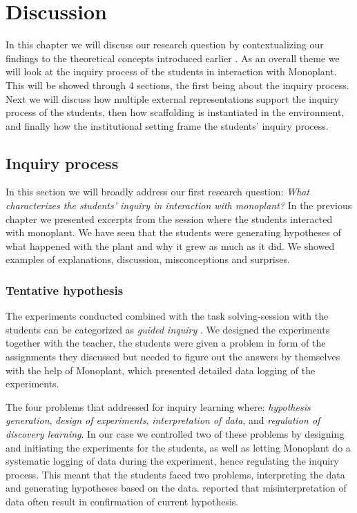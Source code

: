 \chapter{Discussion}
In this chapter we will discuss our research question by contextualizing our findings to the theoretical concepts introduced earlier . As an overall theme we will look at the inquiry process of the students in interaction with Monoplant. This will be showed through 4 sections, the first being about the inquiry process. Next we will discuss how multiple external representations support the inquiry process of the students, then how scaffolding is instantiated in the environment, and finally how the institutional setting frame the students' inquiry process.


\section{Inquiry process}
In this section we will broadly address our first research question: \emph{What characterizes the students’ inquiry in interaction with monoplant?}
In the previous chapter we presented excerpts from the session where the students interacted with monoplant. We have seen that the students were generating hypotheses of what happened with the plant and why it grew as much as it did. We showed examples of explanations, discussion, misconceptions and surprises.

\subsection{Tentative hypothesis}
The experiments conducted combined with the task solving-session with the students can be categorized as \emph{guided inquiry} \citeauthor*{staver1987analysis} \citetext{\citeyear{staver1987analysis}, referenced in \citealp{prince2006inductive}}. We designed the experiments together with the teacher, the students were given a problem in form of the assignments they discussed but needed to figure out the answers by themselves with the help of Monoplant, which presented detailed data logging of the experiments.

The four problems that \citet{de1998scientific} addressed for inquiry learning where: \textit{hypothesis generation}, \textit{design of experiments}, \textit{interpretation of data}, and \textit{regulation of discovery learning}. In our case we controlled two of these problems by designing and initiating the experiments for the students, as well as letting Monoplant do a systematic logging of data during the experiment, hence regulating the inquiry process. This meant that the students faced two problems, interpreting the data and generating hypotheses based on the data. \citeauthor*{klahr1993heuristics} \citetext{\citeyear{klahr1993heuristics}, referenced in \citealp{de1998scientific}} reported that misinterpretation of data often result in confirmation of current hypothesis. 


